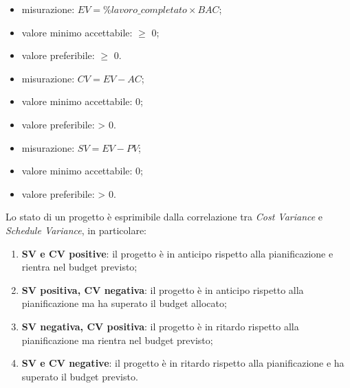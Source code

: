 			\begin{itemize}
				\item{misurazione: $EV = \%lavoro\_completato \times BAC$;}
				\item{valore minimo accettabile: $\geq$ 0;}
				\item{valore preferibile: $\geq$ 0.}
			\end{itemize}

			\begin{itemize}
				\item{misurazione: $CV = EV - AC$;}
				\item{valore minimo accettabile: 0;}
				\item{valore preferibile: > 0.}
			\end{itemize}
		
			\begin{itemize}
				\item{misurazione: $SV = EV - PV$;}
				\item{valore minimo accettabile: 0;}
				\item{valore preferibile: > 0.}
			\end{itemize}
						
		Lo stato di un progetto è esprimibile dalla correlazione tra \textit{Cost Variance} e \textit{Schedule Variance}, in particolare:
		\begin{enumerate}
			\item{\textbf{SV e CV positive}: il progetto è in anticipo rispetto alla pianificazione e rientra nel budget previsto;}
			\item{\textbf{SV positiva, CV negativa}: il progetto è in anticipo rispetto alla pianificazione ma ha superato il budget allocato;}
			\item{\textbf{SV negativa, CV positiva}: il progetto è in ritardo rispetto alla pianificazione ma rientra nel budget previsto;}
			\item{\textbf{SV e CV negative}: il progetto è in ritardo rispetto alla pianificazione e ha superato il budget previsto.}
		\end{enumerate}